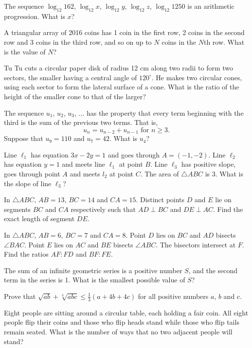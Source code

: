 \begin{problems}
    \problem The sequence $\log_{12}162$, $\log_{12}x$, $\log_{12}y$,
    $\log_{12}z$, $\log_{12}1250$ is an arithmetic progression. What is $x$?

    \problem A triangular array of 2016 coins has 1 coin in the first row, 2
    coins in the second row and 3 coins in the third row, and so on up to $N$
    coins in the $N$th row. What is the value of $N$?

    \problem Tu Tu cuts a circular paper disk of radius 12 cm along two radii
    to form two sectors, the smaller having a central angle of $120^\circ$. He
    makes two circular cones, using each sector to form the lateral surface of
    a cone. What is the ratio of the height of the smaller cone to that of the
    larger?

    \problem The sequence $u_{1}$, $u_{2}$, $u_{3}$, $\ldots$ has the property
    that every term beginning with the third is the sum of the previous two
    terms. That is, \[u_{n} = u_{n - 2} + u_{n - 1} \text{  for  } n \geq 3.\]
    Suppose that $u_{9} = 110$ and $u_{7} = 42$. What is $u_{4}$?

    \problem Line $\ell_{1}$ has equation $3x - 2y = 1$ and goes through $A =
    (-1, -2)$. Line $\ell_{2}$ has equation $y = 1$ and meets line $\ell_{1}$
    at point $B$. Line $\ell_{3}$ has positive slope, goes through point $A$
    and meets $l_{2}$ at point $C$. The area of $\triangle ABC$ is 3. What is
    the slope of line $\ell_{3}$?

    \problem In $\triangle ABC$, $AB = 13$, $BC = 14$ and $CA = 15$. Distinct
    points $D$ and $E$ lie on segments $BC$ and $CA$ respectively such that $AD
    \perp BC$ and $DE \perp AC$. Find the exact length of segment $DE$. 

    \problem In $\triangle ABC$, $AB = 6$, $BC = 7$ and $CA = 8$. Point $D$
    lies on $BC$ and $AD$ bisects $\angle BAC$. Point $E$ lies on $AC$ and $BE$
    bisects $\angle ABC$. The bisectors intersect at $F$. Find the ratios $AF :
    FD$ and $BF : FE$. 

    \problem The sum of an infinite geometric series is a positive number $S$,
    and the second term in the series is 1. What is the smallest possible value
    of $S$?

    \problem Prove that $\sqrt{ab} + \sqrt[3]{abc} \leq \frac{1}{3}(a + 4b +
    4c)$ for all positive numbers $a$, $b$ and $c$. 

    \problem Eight people are sitting around a circular table, each holding a
    fair coin. All eight people flip their coins and those who flip heads stand
    while those who flip tails remain seated. What is the number of ways that
    no two adjacent people will stand?


\end{problems}
